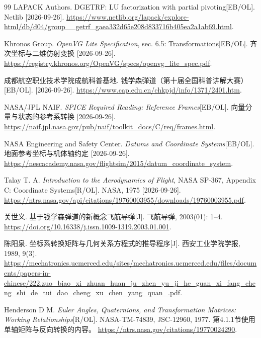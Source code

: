 \documentclass[a4paper,12pt,twoside,openany,fontset=none]{ctexbook}
\numberwithin{equation}{chapter}
\begin{document}
\begin{thebibliography}{99}
LAPACK Authors. DGETRF: LU factorization with partial pivoting[EB/OL]. Netlib [2026-09-26].
\newblock \url{https://www.netlib.org/lapack/explore-html/db/d04/group__getrf_gaea332d65e208d833716b405ea2a1ab69.html}.


Khronos Group. \textit{OpenVG Lite Specification}, sec. 6.5: Transformations[EB/OL]. 齐次坐标与二维仿射变换 [2026-09-26].
\newblock \url{https://registry.khronos.org/OpenVG/specs/openvg_lite_spec.pdf}.

成都航空职业技术学院成航科普基地. 钱学森弹道（第十届全国科普讲解大赛）[EB/OL]. [2026-09-26].
\newblock \url{https://www.cap.edu.cn/chkpjd/info/1371/2401.htm}.

NASA/JPL NAIF. \textit{SPICE Required Reading: Reference Frames}[EB/OL]. 向量分量与状态的参考系转换 [2026-09-26].
\newblock \url{https://naif.jpl.nasa.gov/pub/naif/toolkit_docs/C/req/frames.html}.

NASA Engineering and Safety Center. \textit{Datums and Coordinate Systems}[EB/OL]. 地面参考坐标与机体轴约定 [2026-09-26].
\newblock \url{https://nescacademy.nasa.gov/flightsim/2015/datum_coordinate_system}.

Talay T. A. \textit{Introduction to the Aerodynamics of Flight}, NASA SP-367, Appendix C: Coordinate Systems[R/OL]. NASA, 1975 [2026-09-26].
\newblock \url{https://ntrs.nasa.gov/api/citations/19760003955/downloads/19760003955.pdf}.

关世义. 基于钱学森弹道的新概念飞航导弹[J]. 飞航导弹, 2003(01): 1--4.
\newblock \url{https://doi.org/10.16338/j.issn.1009-1319.2003.01.001}.

陈阳泉. 坐标系转换矩阵与几何关系方程式的推导程序[J]. 西安工业学院学报, 1989, 9(3).
\newblock \url{https://mechatronics.ucmerced.edu/sites/mechatronics.ucmerced.edu/files/documents/papers-in-chinese/222.zuo_biao_xi_zhuan_huan_ju_zhen_yu_ji_he_guan_xi_fang_cheng_shi_de_tui_dao_cheng_xu_chen_yang_quan_.pdf}.

Henderson D M. \textit{Euler Angles, Quaternions, and Transformation Matrices: Working Relationships}[R/OL]. NASA-TM-74839, JSC-12960, 1977. 第4.1.1节使用单轴矩阵与反向转换的内容。
\newblock \url{https://ntrs.nasa.gov/citations/19770024290}.


\end{thebibliography}
\end{document}
